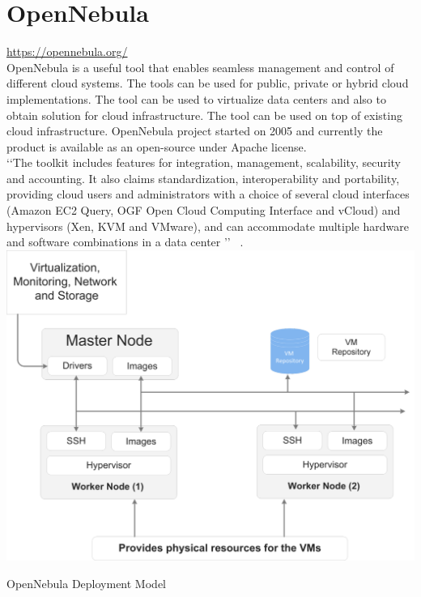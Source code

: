 \usepackage{graphicx}
\graphicspath{ {images/} }
\section{OpenNebula}
\url{https://opennebula.org/} \\ 
   
OpenNebula is a useful tool that enables seamless management and control of different cloud systems.
The tools can be used for public, private or hybrid cloud implementations.
The tool can be used to virtualize data centers and also to obtain solution for cloud infrastructure.
The tool can be used on top of existing cloud infrastructure.
OpenNebula project started on 2005 and currently the product is available as an open-source under Apache license. \\
‘‘The toolkit includes features for integration, management, scalability, security and accounting.
It also claims standardization, interoperability and portability, providing cloud users and administrators with a choice of several
cloud interfaces (Amazon EC2 Query, OGF Open Cloud Computing Interface and vCloud) and hypervisors
(Xen, KVM and VMware), and can accommodate multiple hardware and software combinations in a data center ’’
~\cite{hid-sp18-417-opennebula-wiki}.\\

\includegraphics{hid-sp18-417-opennebula}
\begin{center}
OpenNebula Deployment Model ~\cite{hid-sp18-417-opennebula-deployment} 
\end{center}

